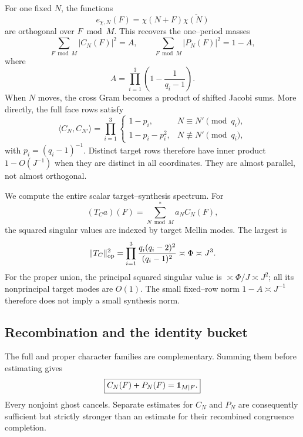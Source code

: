 For one fixed \(N\), the functions
\begin{equation}
 e_{\chi,N}(F)=\chi(N+F)\overline{\chi(N)}
 \label{eq:tpc38-intro-echi}
\end{equation}
are orthogonal over \(F\bmod M\).  This recovers the one--period masses
\begin{equation}
 \sum_{F\bmod M}|C_N(F)|^2=A,\qquad
 \sum_{F\bmod M}|P_N(F)|^2=1-A,
 \label{eq:tpc38-intro-fixed-target-masses}
\end{equation}
where
\begin{equation}
 A=\prod_{i=1}^3\left(1-\frac1{q_i-1}\right).
 \label{eq:tpc38-intro-A}
\end{equation}
When \(N\) moves, the cross Gram becomes a product of shifted Jacobi
sums.  More directly, the full face rows satisfy
\begin{equation}
 \langle C_N,C_{N'}\rangle
 =\prod_{i=1}^3
 \begin{cases}
  1-p_i,&N\equiv N'\pmod{q_i},\\
  1-p_i-p_i^2,&N\not\equiv N'\pmod{q_i},
 \end{cases}
 \label{eq:tpc38-intro-full-row-Gram}
\end{equation}
with \(p_i=(q_i-1)^{-1}\).  Distinct target rows therefore have inner
product \(1-O(J^{-1})\) when they are distinct in all coordinates.  They
are almost parallel, not almost orthogonal.

We compute the entire scalar target--synthesis spectrum.  For
\begin{equation}
 (T_Ca)(F)=\sum_{N\bmod M}^{*}a_NC_N(F),
 \label{eq:tpc38-intro-TC}
\end{equation}
the squared singular values are indexed by target Mellin modes.  The
largest is
\begin{equation}
 \|T_C\|_{\operatorname{op}}^2
 =\prod_{i=1}^3\frac{q_i(q_i-2)^2}{(q_i-1)^2}
 \asymp\Phi\asymp J^3.
 \label{eq:tpc38-intro-TC-norm}
\end{equation}
For the proper union, the principal squared singular value is
\(\asymp\Phi/J\asymp J^2\); all its nonprincipal target modes are
\(O(1)\).  The small fixed--row norm \(1-A\asymp J^{-1}\) therefore does
not imply a small synthesis norm.

\subsection{Recombination and the identity bucket}

The full and proper character families are complementary.  Summing them
before estimating gives
\begin{equation}
 \boxed{C_N(F)+P_N(F)=\mathbf 1_{M\mid F}.}
 \label{eq:tpc38-intro-recombination}
\end{equation}
Every nonjoint ghost cancels.  Separate estimates for \(C_N\) and \(P_N\)
are consequently sufficient but strictly stronger than an estimate for
their recombined congruence completion.

